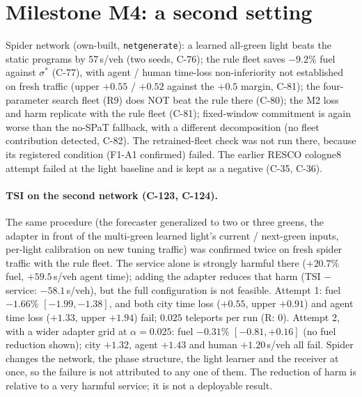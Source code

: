 \documentclass[11pt]{article}
\begin{document}
\section{Milestone M4: a second setting}
Spider network (own-built, \texttt{netgenerate}): a learned all-green light beats the static programs by 57\,s/veh (two seeds, C-76); the
rule fleet saves $-9.2\%$ fuel against $\sigma^*$ (C-77), with agent / human time-loss non-inferiority not established on fresh traffic
(upper $+0.55$ / $+0.52$ against the $+0.5$ margin, C-81);
the four-parameter search fleet (R9) does NOT beat the rule there (C-80); the M2 loss and harm replicate with the rule fleet (C-81); fixed-window commitment is again worse than the
no-SPaT fallback, with a different decomposition (no fleet contribution detected, C-82). The retrained-fleet check was not run there, because its registered condition (F1-A1 confirmed) failed. The
earlier RESCO cologne8 attempt failed at the light baseline and is kept as a negative (C-35, C-36).
\paragraph{TSI on the second network (C-123, C-124).} The same procedure (the forecaster generalized to two or three greens, the adapter
in front of the multi-green learned light's current / next-green inputs, per-light calibration on new tuning traffic) was confirmed twice on
fresh spider traffic with the rule fleet. The service alone is strongly harmful there ($+20.7\%$ fuel, $+59.5$\,s/veh agent time); adding
the adapter reduces that harm (TSI $-$ service: $-58.1$\,s/veh), but the full configuration is not feasible. Attempt 1: fuel $-1.66\%$
$[-1.99,-1.38]$, and both city time loss ($+0.55$, upper $+0.91$) and agent time loss ($+1.33$, upper $+1.94$) fail; $0.025$ teleports per
run (R: 0). Attempt 2, with a wider adapter grid at $\alpha=0.025$: fuel $-0.31\%$ $[-0.81,+0.16]$ (no fuel reduction shown); city $+1.32$,
agent $+1.43$ and human $+1.20$\,s/veh all fail. Spider changes the network, the phase structure, the light learner and the receiver at
once, so the failure is not attributed to any one of them. The reduction of harm is relative to a very harmful service; it is not a
deployable result.
\end{document}
